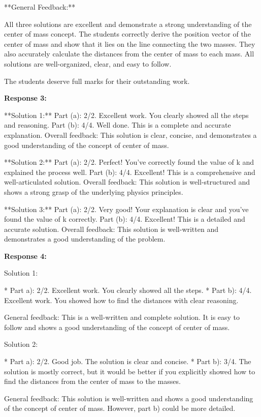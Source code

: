 \documentclass[a4paper,11pt]{article}
\begin{document}
**General Feedback:**

All three solutions are excellent and demonstrate a strong understanding of the center of mass concept. The students correctly derive the position vector of the center of mass and show that it lies on the line connecting the two masses. They also accurately calculate the distances from the center of mass to each mass. All solutions are well-organized, clear, and easy to follow. 

The students deserve full marks for their outstanding work.

\bigskip    
\textbf{Response 3:}

**Solution 1:**
Part (a): 2/2. Excellent work. You clearly showed all the steps and reasoning.
Part (b): 4/4. Well done. This is a complete and accurate explanation.
Overall feedback: This solution is clear, concise, and demonstrates a good understanding of the concept of center of mass.

**Solution 2:**
Part (a): 2/2. Perfect! You've correctly found the value of k and explained the process well.
Part (b): 4/4. Excellent! This is a comprehensive and well-articulated solution.
Overall feedback: This solution is well-structured and shows a strong grasp of the underlying physics principles.

**Solution 3:**
Part (a): 2/2. Very good! Your explanation is clear and you've found the value of k correctly.
Part (b): 4/4. Excellent! This is a detailed and accurate solution.
Overall feedback: This solution is well-written and demonstrates a good understanding of the problem.

\bigskip    
\textbf{Response 4:}

Solution 1:

*   Part a): 2/2. Excellent work. You clearly showed all the steps.
*   Part b): 4/4. Excellent work. You showed how to find the distances with clear reasoning.

General feedback: This is a well-written and complete solution. It is easy to follow and shows a good understanding of the concept of center of mass.

Solution 2:

*   Part a): 2/2. Good job. The solution is clear and concise.
*   Part b): 3/4. The solution is mostly correct, but it would be better if you explicitly showed how to find the distances from the center of mass to the masses.

General feedback: This solution is well-written and shows a good understanding of the concept of center of mass. However, part b) could be more detailed.
\end{document}
